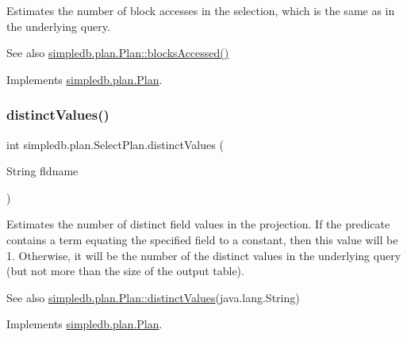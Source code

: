 Estimates the number of block accesses in the selection, which is the same as in the underlying query. \begin{DoxySeeAlso}{See also}
\hyperlink{interfacesimpledb_1_1plan_1_1Plan_a6a333b95b956fe224812155b9d1c8202}{simpledb.\+plan.\+Plan\+::blocks\+Accessed()} 
\end{DoxySeeAlso}


Implements \hyperlink{interfacesimpledb_1_1plan_1_1Plan_a6a333b95b956fe224812155b9d1c8202}{simpledb.\+plan.\+Plan}.

\mbox{\label{classsimpledb_1_1plan_1_1SelectPlan_ac7c325819656fe5de7a5b4b88ced3bc7}} 
\subsubsection{\texorpdfstring{distinct\+Values()}{distinctValues()}}
{\footnotesize\ttfamily int simpledb.\+plan.\+Select\+Plan.\+distinct\+Values (\begin{DoxyParamCaption}\item[{String}]{fldname }\end{DoxyParamCaption})\hspace{0.3cm}{\ttfamily [inline]}}

Estimates the number of distinct field values in the projection. If the predicate contains a term equating the specified field to a constant, then this value will be 1. Otherwise, it will be the number of the distinct values in the underlying query (but not more than the size of the output table). \begin{DoxySeeAlso}{See also}
\hyperlink{interfacesimpledb_1_1plan_1_1Plan_a55094c16c756b0c09b5c71b94d573271}{simpledb.\+plan.\+Plan\+::distinct\+Values}(java.\+lang.\+String) 
\end{DoxySeeAlso}


Implements \hyperlink{interfacesimpledb_1_1plan_1_1Plan_a55094c16c756b0c09b5c71b94d573271}{simpledb.\+plan.\+Plan}.

\mbox{\label{classsimpledb_1_1plan_1_1SelectPlan_aa18edd10f7bac870ffd458c8da82c5f1}} 
